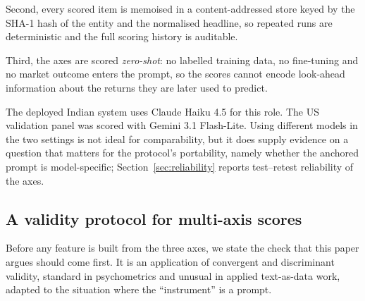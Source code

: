 Second, every scored item is memoised in a content-addressed store keyed by the
SHA-1 hash of the entity and the normalised headline, so repeated runs are
deterministic and the full scoring history is auditable.

Third, the axes are scored \emph{zero-shot}: no labelled training data, no
fine-tuning and no market outcome enters the prompt, so the scores cannot encode
look-ahead information about the returns they are later used to predict.

The deployed Indian system uses Claude Haiku 4.5 for this role. The US validation
panel was scored with Gemini 3.1 Flash-Lite. Using different models in the two
settings is not ideal for comparability, but it does supply evidence on a
question that matters for the protocol's portability, namely whether the anchored
prompt is model-specific; Section~\ref{sec:reliability} reports test--retest
reliability of the axes.

\subsection{A validity protocol for multi-axis scores}\label{sec:protocol}

Before any feature is built from the three axes, we state the check that this
paper argues should come first. It is an application of convergent and
discriminant validity, standard in psychometrics and unusual in applied
text-as-data work, adapted to the situation where the ``instrument'' is a prompt.

